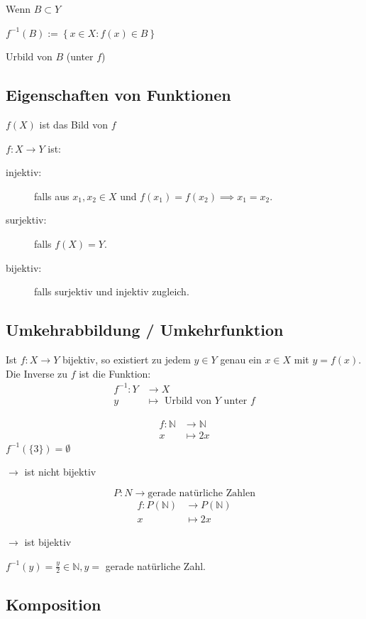\documentclass[fleqn]{scrbook}
\newcommand{\N}{\mathbb{N}}
\newenvironment{example}{{\bfseries Beispiel }}{}
\begin{document}
Wenn $B \subset Y$ 

$f^{-1}(B):=\left\{ x \in X : f(x) \in B \right\}$

Urbild von $B$ (unter $f$)

\subsection{Eigenschaften von Funktionen}

$f(X)$ ist das Bild von $f$

$f : X \to Y$ ist:

\begin{description}
  \item[injektiv:] falls aus $x_1,x_2 \in X$ und $f(x_1)=f(x_2) \implies x_1=x_2$. 
  \item[surjektiv:] falls $f(X) = Y$.
  \item[bijektiv:] falls surjektiv und injektiv zugleich.
\end{description}

\subsection{Umkehrabbildung / Umkehrfunktion}
Ist $f : X \to Y$ bijektiv, so existiert zu jedem $y \in Y$ genau ein $x \in X$ mit $y =f(x)$. Die Inverse zu $f$ ist die Funktion: 
\begin{align*}
  f^{-1} : Y &\to X\\
  y &\mapsto \text{ Urbild von } Y \text{ unter } f
\end{align*}

\begin{example}
\begin{align*}
  f : \N & \to     \N\\
                    x & \mapsto 2x
\end{align*}
$ f^{-1}(\{3\}) = \emptyset $

$\rightarrow$ ist nicht bijektiv

\[P : N \to \text{gerade natürliche Zahlen}\]
\begin{align*}
  f : P(\N) & \to     P(\N)\\
                       x & \mapsto 2x
\end{align*}
\end{example}

$\rightarrow$ ist bijektiv

$f^{-1}(y)=\frac{y}{2} \in \N,y=$ gerade natürliche Zahl.

\subsection{Komposition}
\end{document}
